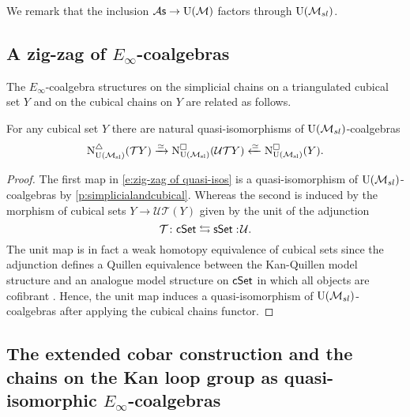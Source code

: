 We remark that the inclusion ${\mathcal{A}\mathsf{s}} \to {\operatorname{U}(\mathcal{M})}$ factors through ${\operatorname{U}(\mathcal{M}_{sl})}$.

\subsection{A zig-zag of $E_\infty$-coalgebras}
The $E_{\infty}$-coalgebra structures on the simplicial chains on a triangulated cubical set $Y$ and on the cubical chains on $Y$ are related as follows.

\begin{lemma} \label{l:zigzag} 
	For any cubical set $Y$ there are natural quasi-isomorphisms of ${\operatorname{U}(\mathcal{M}_{sl})}$-coalgebras
	\begin{equation} \label{e:zig-zag of quasi-isos}
	\operatorname{N^{\triangle}_{{\operatorname{U}(\mathcal{M}_{sl})}}}(\mathcal{T}Y) \xrightarrow{\simeq}
	\operatorname{N^{\square}_{{\operatorname{U}(\mathcal{M}_{sl})}}}(\mathcal{U}\mathcal{T}Y) \xleftarrow{\simeq}
	\operatorname{N^{\square}_{{\operatorname{U}(\mathcal{M}_{sl})}}}(Y).
	\end{equation}	
\end{lemma}

\begin{proof}
	The first map in \eqref{e:zig-zag of quasi-isos} is a quasi-isomorphism of ${\operatorname{U}(\mathcal{M}_{sl})}$-coalgebras by \cref{p:simplicialandcubical}.
	Whereas the second is induced by the morphism of cubical sets $Y \to \mathcal{U} \mathcal{T} (Y)$ given by the unit of the adjunction
	\begin{equation*}
	\mathcal{T} \colon \mathsf{cSet} \leftrightarrows \mathsf{sSet} :\! \mathcal{U}.
	\end{equation*}
	The unit map is in fact a weak homotopy equivalence of cubical sets since the adjunction defines a Quillen equivalence between the Kan-Quillen model structure and an analogue model structure on $\mathsf{cSet}$ in which all objects are cofibrant \cite{cisinski2006presheaves}.
	Hence, the unit map induces a quasi-isomorphism of ${\operatorname{U}(\mathcal{M}_{sl})}$-coalgebras after applying the cubical chains functor.
\end{proof}

\subsection{The extended cobar construction and the chains on the Kan loop group as quasi-isomorphic $E_{\infty}$-coalgebras}


